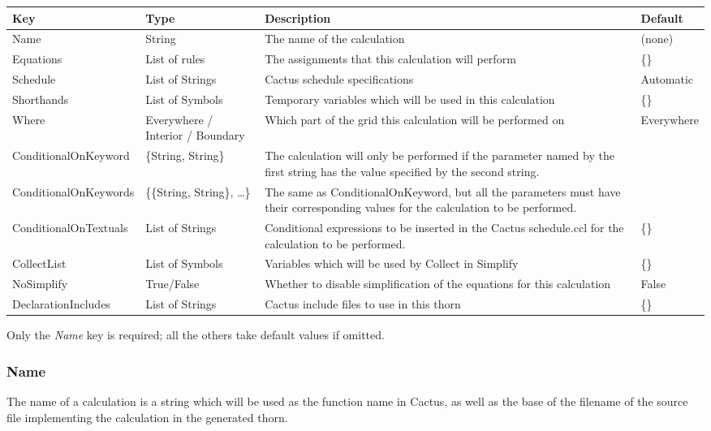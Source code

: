 \documentclass{report}
\newcommand{\tablewidth}{\textwidth}
\begin{document}
\begin{center}
\begin{tabularx}{\tablewidth}{|l|X|X|l|}
  \hline
  \bf Key & \bf Type & \bf Description & \bf Default\\
  \hline
  Name & String & The name of the calculation & (none) \\
  Equations & List of rules & The assignments that this calculation will perform & \{\} \\
  Schedule & List of Strings & Cactus schedule specifications & Automatic \\
  Shorthands & List of Symbols & Temporary variables which will be used in this calculation & \{\} \\
  Where &  Everywhere / Interior / Boundary & Which part of the grid this calculation will be performed on & Everywhere \\
  ConditionalOnKeyword & \{String, String\} &
    The calculation will only be performed if the parameter named by the first string has the value specified by the second string.   &  \\
  ConditionalOnKeywords & \{\{String, String\}, \ldots \} &
    The same as ConditionalOnKeyword, but all the parameters must have their corresponding values for the calculation to be performed.&  \\
  ConditionalOnTextuals & List of Strings & Conditional expressions to be inserted in the Cactus schedule.ccl for the calculation to be performed. & \{\} \\
  CollectList & List of Symbols & Variables which will be used by Collect in Simplify & \{\} \\
  NoSimplify & True/False & Whether to disable simplification of the equations for this calculation & False \\
  DeclarationIncludes & List of Strings & Cactus include files to use in this thorn & \{\} \\
  \hline
\end{tabularx}
\end{center}

Only the {\it Name} key is required; all the others take default
values if omitted.

\subsubsection{Name}

The name of a calculation is a string which will be used as the
function name in Cactus, as well as the base of the filename of the
source file implementing the calculation in the generated thorn.
\end{document}
